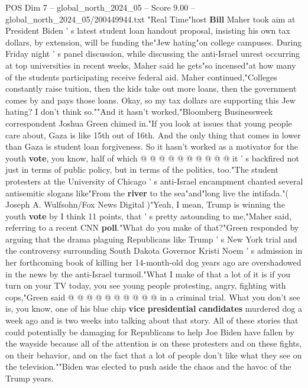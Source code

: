 \begin{textsample}{POS Dim 7 – global\_north\_2024\_05 – Score 9.00 – global\_north\_2024\_05/200449944.txt}  \label{ex:f7_pos_055}
"Real Time"host \textbf{Bill} Maher took aim at President Biden ' s latest student loan handout proposal, insisting his own tax dollars, by extension, will be funding the"Jew hating"on college campuses.
During Friday night ' s panel discussion, while discussing the anti-Israel unrest occurring at top universities in recent weeks, Maher said he gets"so incensed"at how many of the students participating receive federal aid.
Maher continued,"Colleges constantly raise tuition, then the kids take out more loans, then the government comes by and pays those loans.
Okay, so my tax dollars are supporting this Jew hating?
I don't think so.""And it hasn't worked,"Bloomberg Businessweek correspondent Joshua Green chimed in."If you look at issues that young people care about, Gaza is like 15th out of 16th.
And the only thing that comes in lower than Gaza is student loan forgiveness.
So it hasn't worked as a motivator for the youth \textbf{vote}, you know, half of which @ @ @ @ @ @ @ @ @ @ it ' s backfired not just in terms of public policy, but in terms of the politics, too."The student protesters at the University of Chicago ' s anti-Israel encampment chanted several antisemitic slogans like"From the \textbf{river} to the sea"and"long live the intifada."( Joseph A.
Wulfsohn/Fox News Digital )"Yeah, I mean, Trump is winning the youth \textbf{vote} by I think 11 points, that ' s pretty astounding to me,"Maher said, referring to a recent CNN \textbf{poll}."What do you make of that?"Green responded by arguing that the drama plaguing Republicans like Trump ' s New York trial and the controversy surrounding South Dakota Governor Kristi Noem ' s admission in her forthcoming book of killing her 14-month-old dog years ago are overshadowed in the news by the anti-Israel turmoil."What I make of that a lot of it is if you turn on your TV today, you see young people protesting, angry, fighting with cops,"Green said @ @ @ @ @ @ @ @ @ @ in a criminal trial.
What you don't see is, you know, one of his blue chip \textbf{vice} \textbf{presidential} \textbf{candidates} murdered dog a week ago and is two weeks into talking about that story.
All of these stories that could potentially be damaging for Republicans to help Joe Biden have fallen by the wayside because all of the attention is on these protesters and on these fights, on their behavior, and on the fact that a lot of people don't like what they see on the television.""Biden was elected to push aside the chaos and the havoc of the Trump years.

\end{textsample}

